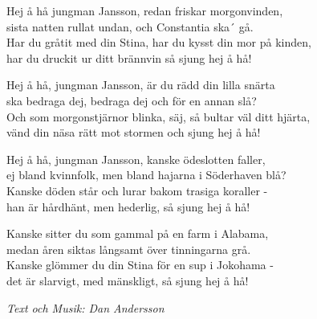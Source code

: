 \vspace{10pt}
Hej å hå jungman Jansson, redan friskar morgonvinden,\\
sista natten rullat undan, och Constantia ska´ gå.\\
Har du gråtit med din Stina, har du kysst din mor på kinden,\\
har du druckit ur ditt brännvin så sjung hej å hå!\par
\vspace{10pt}
Hej å hå, jungman Jansson, är du rädd din lilla snärta\\
ska bedraga dej, bedraga dej och för en annan slå?\\
Och som morgonstjärnor blinka, säj, så bultar väl ditt hjärta,\\
vänd din näsa rätt mot stormen och sjung hej å hå!\par
\vspace{10pt}
Hej å hå, jungman Jansson, kanske ödeslotten faller,\\
ej bland kvinnfolk, men bland hajarna i Söderhaven blå?\\
Kanske döden står och lurar bakom trasiga koraller -\\
han är hårdhänt, men hederlig, så sjung hej å hå!\par
\vspace{10pt}
Kanske sitter du som gammal på en farm i Alabama,\\
medan åren siktas långsamt över tinningarna grå.\\
Kanske glömmer du din Stina för en sup i Jokohama -\\
det är slarvigt, med mänskligt, så sjung hej å hå!
\par
\vspace{10pt}
{\footnotesize\textit{Text och Musik: Dan Andersson}}
